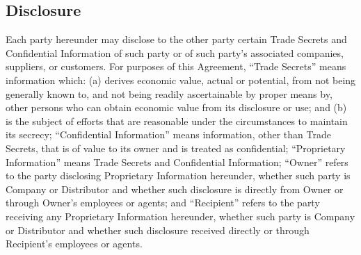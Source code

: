 \documentclass[letterpaper,10pt,english]{sphinxmanual}
\begin{document}
\subsection{Disclosure}
\label{\detokenize{nondisclosure:disclosure}}
Each party hereunder may disclose to the other party certain Trade Secrets and Confidential Information of such party or of such party’s associated companies, suppliers, or customers. For purposes of this Agreement, “Trade Secrets” means information which: (a) derives economic value, actual or potential, from not being generally known to, and not being readily ascertainable by proper means by, other persons who can obtain economic value from its disclosure or use; and (b) is the subject of efforts that are reasonable under the circumstances to maintain its secrecy; “Confidential Information” means information, other than Trade Secrets, that is of value to its owner and is treated as confidential; “Proprietary Information” means Trade Secrets and Confidential Information; “Owner” refers to the party disclosing Proprietary Information hereunder, whether such party is Company or Distributor and whether such disclosure is directly from Owner or through Owner’s employees or agents; and “Recipient” refers to the party receiving any Proprietary Information hereunder, whether such party is Company or Distributor and whether such disclosure received directly or through Recipient’s employees or agents.
\end{document}
